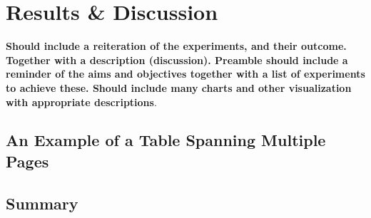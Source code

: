 \chapter{Results \& Discussion}
\textbf{Should include a reiteration of the experiments, and their outcome.  Together with a description (discussion).  Preamble should include a reminder of the aims and objectives together with a list of experiments to achieve these.  Should include many charts and other visualization with appropriate descriptions}.  

\Blindtext

\section{An Example of a Table Spanning Multiple Pages}



\section{Summary}
\blindtext\enlargethispage{\baselineskip} %